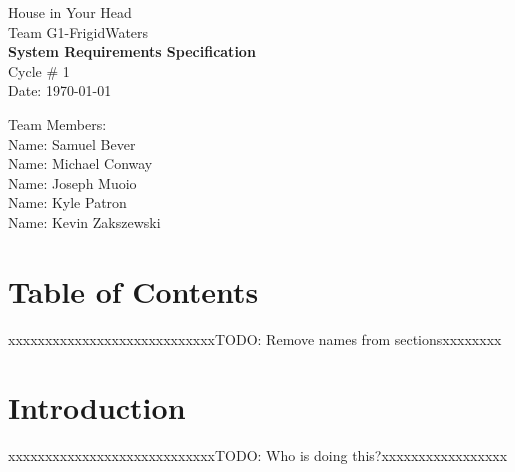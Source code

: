 \documentclass{article}
\begin{document}
\begin{titlepage}
    \begin{center}
        \begin{huge}
        House in Your Head \\[1cm]
        Team G1-FrigidWaters \\[2.2cm]
        { \bfseries System Requirements Specification } \\[1cm]
        Cycle \# 1\\[2.2cm]
        Date: \required\today\\[1cm]
        \end{huge}
    \end{center}
    \null \vfill
    \begin{large}
        Team Members: \\[0.5cm]
        Name: Samuel Bever\\[0.5cm]
        Name: Michael Conway\\[0.5cm]
        Name: Joseph Muoio\\[0.5cm]
        Name: Kyle Patron\\[0.5cm]
        Name: Kevin Zakszewski
    \end{large}
\end{titlepage}
\section*{\centering Table of Contents}
\makeatletter
{}
\newcommand{\hsubsubsection}{
\@startsection{subsubsection}{3}{\z@}%
                                     {-3.25ex\@plus -1ex \@minus -.2ex}%
                                     {-1.5ex \@plus -.2ex}%
                                     {R\normalfont\normalsize}}
\newcommand{\hparagraph}{
\@startsection{paragraph}{4}{\z@}%
                                     {-3.25ex\@plus -1ex \@minus -.2ex}%
                                     {-1.5ex \@plus -.2ex}%
                                     {R\normalfont\normalsize}}
\newcommand{\hsubparagraph}{
\@startsection{subparagraph}{5}{\z@}%
                                     {-3.25ex\@plus -1ex \@minus -.2ex}%
                                     {-1.5ex \@plus -.2ex}%
                                     {R\normalfont\normalsize}}
\setcounter{secnumdepth}{5}
\makeatother
\newpage
 

{\color{red}xxxxxxxxxxxxxxxxxxxxxxxxxxxxTODO: Remove names from sectionsxxxxxxxx}
\section{Introduction}
{\color{red}xxxxxxxxxxxxxxxxxxxxxxxxxxxxTODO: Who is doing this?xxxxxxxxxxxxxxxxx}
\end{document}
